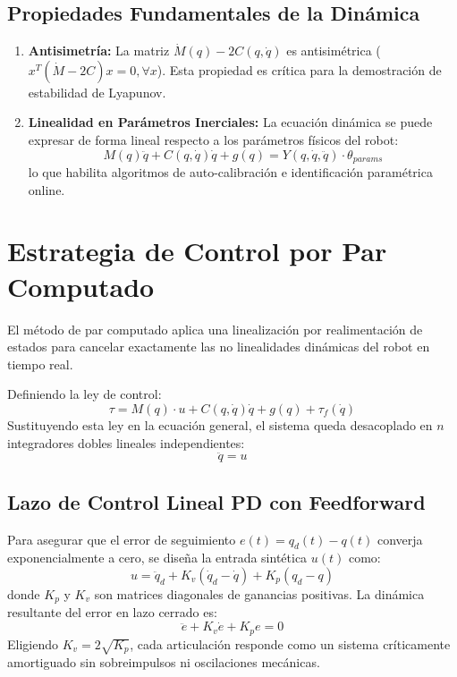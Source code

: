 \documentclass[11pt,a4paper]{article}
\begin{document}
\subsection{Propiedades Fundamentales de la Dinámica}
\begin{enumerate}
    \item \textbf{Antisimetría:} La matriz $\dot{M}(q) - 2C(q,\dot{q})$ es antisimétrica ($x^T (\dot{M} - 2C) x = 0, \forall x$). Esta propiedad es crítica para la demostración de estabilidad de Lyapunov.
    \item \textbf{Linealidad en Parámetros Inerciales:} La ecuación dinámica se puede expresar de forma lineal respecto a los parámetros físicos del robot:
    \begin{equation}
    M(q)\ddot{q} + C(q,\dot{q})\dot{q} + g(q) = Y(q,\dot{q},\ddot{q}) \cdot \theta_{params}
    \end{equation}
    lo que habilita algoritmos de auto-calibración e identificación paramétrica online.
\end{enumerate}

\section{Estrategia de Control por Par Computado}
El método de par computado aplica una linealización por realimentación de estados para cancelar exactamente las no linealidades dinámicas del robot en tiempo real. 

Definiendo la ley de control:
\begin{equation}
\tau = M(q) \cdot u + C(q,\dot{q})\dot{q} + g(q) + \tau_f(\dot{q})
\end{equation}
Sustituyendo esta ley en la ecuación general, el sistema queda desacoplado en $n$ integradores dobles lineales independientes:
\begin{equation}
\ddot{q} = u
\end{equation}

\subsection{Lazo de Control Lineal PD con Feedforward}
Para asegurar que el error de seguimiento $e(t) = q_d(t) - q(t)$ converja exponencialmente a cero, se diseña la entrada sintética $u(t)$ como:
\begin{equation}
u = \ddot{q}_d + K_v (\dot{q}_d - \dot{q}) + K_p (q_d - q)
\end{equation}
donde $K_p$ y $K_v$ son matrices diagonales de ganancias positivas. La dinámica resultante del error en lazo cerrado es:
\begin{equation}
\ddot{e} + K_v \dot{e} + K_p e = 0
\end{equation}
Eligiendo $K_v = 2\sqrt{K_p}$, cada articulación responde como un sistema críticamente amortiguado sin sobreimpulsos ni oscilaciones mecánicas.
\end{document}
